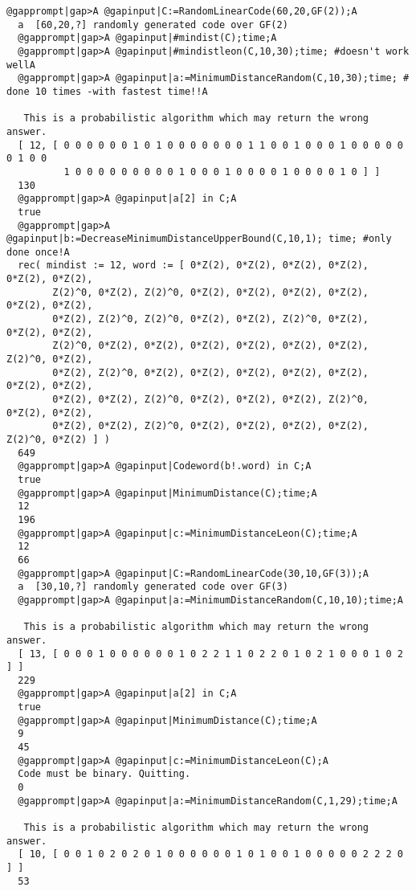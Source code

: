 \documentclass[a4paper,11pt]{report}
\begin{document}
{{ 
\begin{Verbatim}[commandchars=@|A,fontsize=\small,frame=single,label=Example]
  @gapprompt|gap>A @gapinput|C:=RandomLinearCode(60,20,GF(2));A
  a  [60,20,?] randomly generated code over GF(2)
  @gapprompt|gap>A @gapinput|#mindist(C);time;A
  @gapprompt|gap>A @gapinput|#mindistleon(C,10,30);time; #doesn't work wellA
  @gapprompt|gap>A @gapinput|a:=MinimumDistanceRandom(C,10,30);time; # done 10 times -with fastest time!!A
  
   This is a probabilistic algorithm which may return the wrong answer.
  [ 12, [ 0 0 0 0 0 0 1 0 1 0 0 0 0 0 0 0 1 1 0 0 1 0 0 0 1 0 0 0 0 0 0 1 0 0 
          1 0 0 0 0 0 0 0 0 0 1 0 0 0 1 0 0 0 0 1 0 0 0 0 1 0 ] ]
  130
  @gapprompt|gap>A @gapinput|a[2] in C;A
  true
  @gapprompt|gap>A @gapinput|b:=DecreaseMinimumDistanceUpperBound(C,10,1); time; #only done once!A
  rec( mindist := 12, word := [ 0*Z(2), 0*Z(2), 0*Z(2), 0*Z(2), 0*Z(2), 0*Z(2), 
        Z(2)^0, 0*Z(2), Z(2)^0, 0*Z(2), 0*Z(2), 0*Z(2), 0*Z(2), 0*Z(2), 0*Z(2), 
        0*Z(2), Z(2)^0, Z(2)^0, 0*Z(2), 0*Z(2), Z(2)^0, 0*Z(2), 0*Z(2), 0*Z(2), 
        Z(2)^0, 0*Z(2), 0*Z(2), 0*Z(2), 0*Z(2), 0*Z(2), 0*Z(2), Z(2)^0, 0*Z(2), 
        0*Z(2), Z(2)^0, 0*Z(2), 0*Z(2), 0*Z(2), 0*Z(2), 0*Z(2), 0*Z(2), 0*Z(2), 
        0*Z(2), 0*Z(2), Z(2)^0, 0*Z(2), 0*Z(2), 0*Z(2), Z(2)^0, 0*Z(2), 0*Z(2), 
        0*Z(2), 0*Z(2), Z(2)^0, 0*Z(2), 0*Z(2), 0*Z(2), 0*Z(2), Z(2)^0, 0*Z(2) ] )
  649
  @gapprompt|gap>A @gapinput|Codeword(b!.word) in C;A
  true
  @gapprompt|gap>A @gapinput|MinimumDistance(C);time;A
  12
  196
  @gapprompt|gap>A @gapinput|c:=MinimumDistanceLeon(C);time;A
  12
  66
  @gapprompt|gap>A @gapinput|C:=RandomLinearCode(30,10,GF(3));A
  a  [30,10,?] randomly generated code over GF(3)
  @gapprompt|gap>A @gapinput|a:=MinimumDistanceRandom(C,10,10);time;A
  
   This is a probabilistic algorithm which may return the wrong answer.
  [ 13, [ 0 0 0 1 0 0 0 0 0 0 1 0 2 2 1 1 0 2 2 0 1 0 2 1 0 0 0 1 0 2 ] ]
  229
  @gapprompt|gap>A @gapinput|a[2] in C;A
  true
  @gapprompt|gap>A @gapinput|MinimumDistance(C);time;A
  9
  45
  @gapprompt|gap>A @gapinput|c:=MinimumDistanceLeon(C);A
  Code must be binary. Quitting.
  0
  @gapprompt|gap>A @gapinput|a:=MinimumDistanceRandom(C,1,29);time;A
  
   This is a probabilistic algorithm which may return the wrong answer.
  [ 10, [ 0 0 1 0 2 0 2 0 1 0 0 0 0 0 0 1 0 1 0 0 1 0 0 0 0 0 2 2 2 0 ] ]
  53
\end{Verbatim}
    

}}
\end{document}
